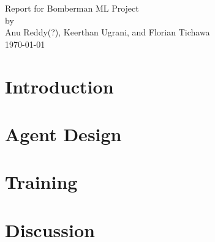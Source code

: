 \documentclass[12pt]{article}
\begin{document}

  \pagestyle{fancy}

  \thispagestyle{empty}
  \begin{center}
    \Large Report for Bomberman ML Project\\[2\baselineskip]
    by\\
    Anu Reddy(?), Keerthan Ugrani, and Florian Tichawa\\
    [2\baselineskip]
    \today\\
    \vfill
  \end{center}

  \pagebreak

  \tableofcontents

  \pagebreak
  \glsresetall
  \section{Introduction}
  \label{sec:intro}
  

  \section{Agent Design}
  \label{sec:design}
  

  \section{Training}
  \label{sec:training}
  

  \section{Discussion}
  \label{sec:discussion}
  

  \pagebreak
  \printglossaries

  \pagebreak
  \printbibliography
\end{document}
